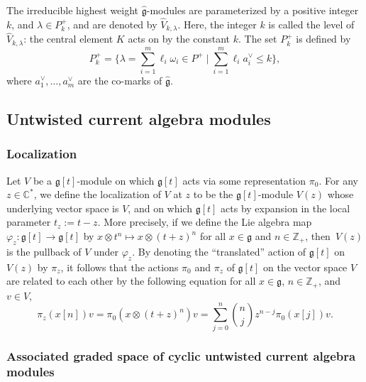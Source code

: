 \documentclass[10pt,a4paper]{amsart}
\numberwithin{equation}{section}
\begin{document}
The irreducible highest weight $\widehat{\mathfrak{g}}$-modules are parameterized by a positive integer $k$, and $\lambda\in P_k^+$, and are denoted by $\widehat{V}_{k,\lambda}$. Here, the integer $k$ is called the level of $\widehat{V}_{k,\lambda}$: the central element $K$ acts on  by the constant $k$. The set $P_k^+$ is defined by
\begin{equation*}
P_k^+=\Bigg\{\lambda=\sum_{i=1}^m\ell_i\omega_i\in P^+\mid \sum_{i=1}^m\ell_ia_i^{\vee}\leq k\Bigg\},
\end{equation*}
where $a_1^{\vee},\dots,a_m^{\vee}$ are the co-marks of $\widehat{\mathfrak{g}}$.

\subsection{Untwisted current algebra modules}\label{Section 2.2}

\subsubsection{Localization}\label{Section 2.2.1}

Let $V$ be a $\mathfrak{g}[t]$-module on which $\mathfrak{g}[t]$ acts via some representation $\pi_0$. For any $z\in\mathbb{C}^*$, we define the localization of $V$ at $z$ to be the $\mathfrak{g}[t]$-module $V(z)$ whose underlying vector space is $V$, and on which $\mathfrak{g}[t]$ acts by expansion in the local parameter $t_z:=t-z$. More precisely, if we define the Lie algebra map $\varphi_z\colon\mathfrak{g}[t]\to\mathfrak{g}[t]$ by $x\otimes t^n\mapsto x\otimes(t+z)^n$ for all $x\in\mathfrak{g}$ and $n\in\mathbb{Z}_+$, then~$V(z)$ is the pullback of $V$ under $\varphi_z$. By denoting the ``translated'' action of $\mathfrak{g}[t]$ on $V(z)$ by $\pi_z$, it follows that the actions $\pi_0$ and $\pi_z$ of $\mathfrak{g}[t]$ on the vector space $V$ are related to each other by the following equation for all $x\in\mathfrak{g}$, $n\in\mathbb{Z}_+$, and $v\in V$,
\begin{equation}\label{eq:2.1}
\pi_z(x[n])v=\pi_0(x\otimes (t+z)^n)v=\sum_{j=0}^n\binom{n}{j}z^{n-j}\pi_0(x[j])v.
\end{equation}

\subsubsection{Associated graded space of cyclic untwisted current algebra modules}\label{Section 2.2.2}
\end{document}
